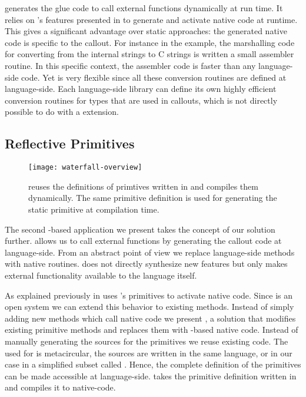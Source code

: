 \NB generates the glue code to call external functions dynamically at run time.
It relies on \B's features presented in  to generate and activate native code at runtime.
This gives \NB a significant advantage over static approaches: the generated native code is specific to the callout.
For instance in the  example, the marshalling code for converting from the internal \PH strings to C strings is written a small assembler routine.
In this specific context, the assembler code is faster than any language-side code.
Yet \NB is very flexible since all these conversion routines are defined at language-side. 
Each language-side library can define its own highly efficient conversion routines for types that are used in \FFI callouts, which is not directly possible to do with a \VM extension.


\subsection{Reflective Primitives}

\begin{figure}[h]
	\centering
	\texttt{[image: waterfall-overview]}
	\caption[\WF Overview]{\WF reuses the definitions of \VM primtives written in \Slang and compiles them dynamically. The same primitive definition is used for generating the static primitive at \VM compilation time.}
\end{figure}

\noindent The second \B-based application we present takes the concept of our \FFI solution further.
\NB allows us to call external functions by generating the callout code at language-side.
From an abstract point of view we replace language-side methods with native routines.
\NB does not directly synthesize new features but only makes external functionality available to the language itself.


As explained previously in  \B uses \PH's primitives to activate native code.
Since \PH is an open system we can extend this behavior to existing methods.
Instead of simply adding new methods which call native code we present \WF, a solution that modifies existing primitive methods and replaces them with \B-based native code.
Instead of manually generating the sources for the primitives we reuse existing code.
The \VM used for \PH is metacircular, the \VM sources are written in the same language, or in our case in a simplified subset called \Slang.
Hence, the complete definition of the \VM primitives can be made accessible at language-side.
\WF takes the primitive definition written in \Slang and compiles it to native-code.


